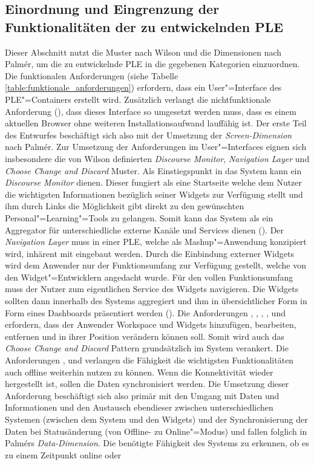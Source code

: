 \subsection{Einordnung und Eingrenzung der Funktionalitäten der zu entwickelnden \ac{PLE}}
Dieser Abschnitt nutzt die Muster nach Wilson und die Dimensionen nach Palmér, um die zu entwickelnde \ac{PLE} in die gegebenen Kategorien einzuordnen.
Die funktionalen Anforderungen (siehe Tabelle \ref{table:funktionale_anforderungen}) erfordern, dass ein User"=Interface des \ac{PLE}"=Containers erstellt wird. Zusätzlich verlangt die nichtfunktionale Anforderung (), dass dieses Interface so umgesetzt werden muss, dass es einem aktuellen Browser ohne weiteren Installationsaufwand lauffähig ist. Der erste Teil des Entwurfes beschäftigt sich also mit der Umsetzung der \emph{Screen-Dimension} nach Palmér. Zur Umsetzung der Anforderungen im User"=Interfaces eignen sich insbesondere die von Wilson definierten \emph{Discourse Monitor}, \emph{Navigation Layer} und \emph{Choose Change and Discard} Muster. Als Einstiegspunkt in das System kann ein \emph{Discourse Monitor} dienen. Dieser fungiert als eine Startseite welche dem Nutzer die wichtigsten Informationen bezüglich seiner Widgets zur Verfügung stellt  und ihm durch Links die Möglichkeit gibt direkt zu den gewünschten Personal"=Learning"=Tools zu gelangen. Somit kann das System als ein Aggregator für unterschiedliche externe Kanäle und Services dienen (). Der \emph{Navigation Layer} muss in einer \ac{PLE}, welche als Mashup"=Anwendung konzipiert wird, inhärent mit eingebaut werden. Durch die Einbindung externer Widgets wird dem Anwender nur der Funktionsumfang zur Verfügung gestellt, welche von den Widget"=Entwicklern angedacht wurde. Für den vollen Funktionsumfang muss der Nutzer zum eigentlichen Service des Widgets navigieren. Die Widgets sollten dann innerhalb des Systems aggregiert und ihm in übersichtlicher Form in Form eines Dashboards präsentiert werden (). Die Anforderungen , , , ,  und  erfordern, dass der Anwender Workspace und Widgets hinzufügen, bearbeiten, entfernen und in ihrer Position verändern können soll. Somit wird auch das \emph{Choose Change and Discard} Pattern grundsätzlich im System verankert. Die Anforderungen ,  und  verlangen die Fähigkeit die wichtigsten Funktionalitäten auch offline weiterhin nutzen zu können. Wenn die Konnektivität wieder hergestellt ist, sollen die Daten synchronisiert werden. Die Umsetzung dieser Anforderung beschäftigt sich also primär mit den Umgang mit Daten und Informationen und den Austausch ebendieser zwischen unterschiedlichen Systemen (zwischen dem System und den Widgets) und der Synchronisierung der Daten bei Statusänderung (von Offline- zu Online"=Modus) und fallen folglich in Palmérs \emph{Data-Dimension}. Die benötigte Fähigkeit des Systems zu erkennen, ob es zu einem Zeitpunkt online oder 
